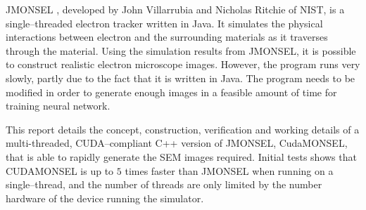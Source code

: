 JMONSEL \cite{villarrubia2015scanning}, developed by John Villarrubia and Nicholas Ritchie of NIST, is a single--threaded electron tracker written in Java. It simulates the physical interactions between electron and the surrounding materials as it traverses through the material. Using the simulation results from JMONSEL, it is possible to construct realistic electron microscope images. However, the program runs very slowly, partly due to the fact that it is written in Java. The program needs to be modified in order to generate enough images in a feasible amount of time for training neural network.

This report details the concept, construction, verification and working details of a multi-threaded, CUDA--compliant C++ version of JMONSEL, CudaMONSEL, that is able to rapidly generate the SEM images required. Initial tests shows that CUDAMONSEL is up to $5$ times faster than JMONSEL when running on a single--thread, and the number of threads are only limited by the number hardware of the device running the simulator.